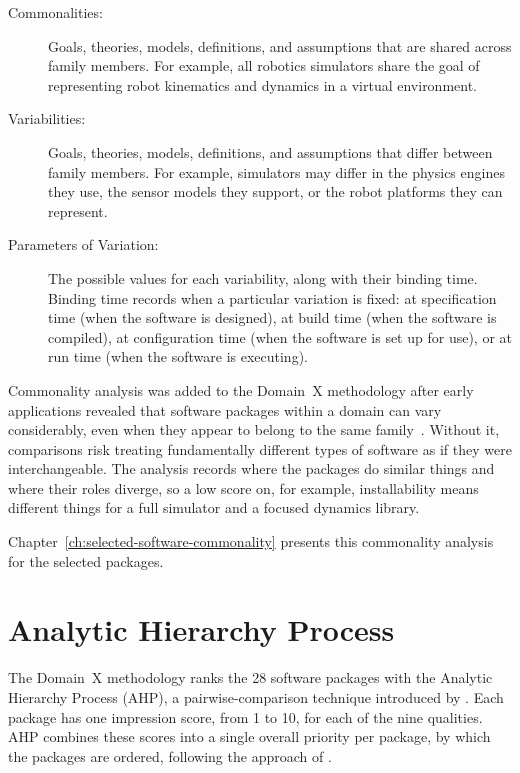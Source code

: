 \begin{description}
    \item[Commonalities:] Goals, theories, models, definitions, and assumptions that are shared across family members. For example, all robotics simulators share the goal of representing robot kinematics and dynamics in a virtual environment.
    \item[Variabilities:] Goals, theories, models, definitions, and assumptions that differ between family members. For example, simulators may differ in the physics engines they use, the sensor models they support, or the robot platforms they can represent.
    \item[Parameters of Variation:] The possible values for each variability, along with their binding time. Binding time records when a particular variation is fixed: at specification time (when the software is designed), at build time (when the software is compiled), at configuration time (when the software is set up for use), or at run time (when the software is executing).
\end{description}

Commonality analysis was added to the Domain~X methodology after early applications revealed that software packages within a domain can vary considerably, even when they appear to belong to the same family~\citep{Smith2024LBM}. Without it, comparisons risk treating fundamentally different types of software as if they were interchangeable. The analysis records where the packages do similar things and where their roles diverge, so a low score on, for example, installability means different things for a full simulator and a focused dynamics library.

Chapter~\ref{ch:selected-software-commonality} presents this commonality analysis for the selected packages.

\section{Analytic Hierarchy Process}
\label{sec:ahp-background}

The Domain~X methodology ranks the 28 software packages with the Analytic Hierarchy Process (AHP), a pairwise-comparison technique introduced by \citet{Saaty1980}. Each package has one impression score, from 1 to 10, for each of the nine qualities. AHP combines these scores into a single overall priority per package, by which the packages are ordered, following the approach of \citet{smith2016state}.

